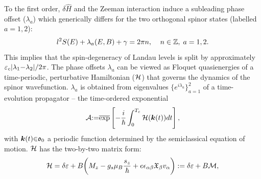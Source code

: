\documentclass[aps, prb, showpacs, twocolumn, notitlepage, superscriptaddress]{revtex4-1}
\begin{document}

To the first order, $\delta \hat{H}$ and the Zeeman interaction induce a subleading phase offset ($\lambda_a$) which generically differs for the two orthogonal spinor states (labelled $a{=}1,2$):
\begin{equation}
l^2S(E)+\lambda_a(E,B)+\gamma=2\pi n,\;\;\;\;  n\in \mathbb{Z},\;a=1,2. \label{eq:rule}
\end{equation}
This implies that the spin-degeneracy of Landau levels is split   by approximately  $\varepsilon_c|\lambda_1{-}\lambda_2|/2\pi$. The phase offsets $\lambda_a$ can be viewed as Floquet quasienergies of a time-periodic, perturbative Hamiltonian (${\cal H}$) that governs the dynamics of the spinor wavefunction.  $\lambda_a$ is obtained  from  eigenvalues $\{e^{i\lambda_a}\}_{a=1}^2$ of a time-evolution propagator -- the time-ordered exponential 
\begin{equation}
{\cal A}{:}{=}\overline{\exp}\left[-\frac{i}{\hbar}\int_0^{T_c} {\cal H}(\boldsymbol{k}(t)) dt\right],
\label{eq:prop}
\end{equation} 
with $\boldsymbol{k}(t){\in}\mathfrak{o}_0$ a periodic function determined by the semiclassical equation of motion.   ${\cal H}$ has the two-by-two matrix form:
\begin{equation}
  {\cal H}=\delta \varepsilon +B\bigg(M_z -g_s\mu_{B}\frac{s_z}{\hbar} + e\epsilon_{\alpha\beta}\mathfrak{X}_{\beta}v_{\alpha}\bigg):=\delta \varepsilon+B{\cal M},\label{eq:H1}
\end{equation}
\end{document}
